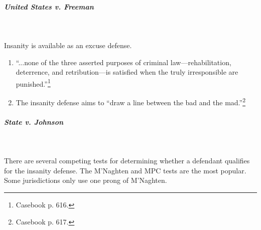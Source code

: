 \paragraph{\emph{United States v. Freeman}}
~\\\\
Insanity is available as an excuse defense.

\begin{enumerate}
    \item ``...none of the three asserted purposes of criminal 
    law---rehabilitation, deterrence, and retribution---is satisfied when the 
    truly irresponsible are punished.''\footnote{Casebook p. 616.}
    \item The insanity defense aims to ``draw a line between the bad and the 
    mad.''\footnote{Casebook p. 617.}
\end{enumerate}

\paragraph{\emph{State v. Johnson}}
~\\\\
There are several competing tests for determining whether a defendant 
qualifies for the insanity defense. The M'Naghten and MPC tests are the most 
popular. Some jurisdictions only use one prong of M'Naghten.


